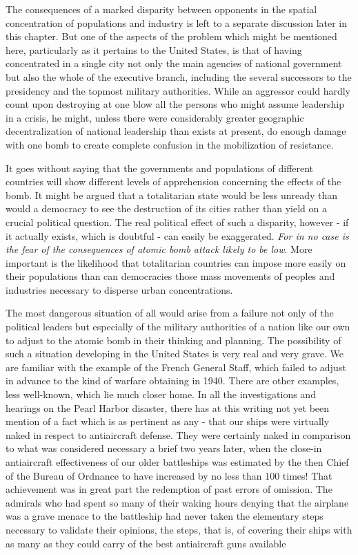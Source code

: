 \label{II-Retaliation1}

The consequences of a marked disparity between opponents in the spatial concentration of populations and industry is left to a separate discussion later in this chapter. But one of the aspects of the problem which might be mentioned here, particularly as it pertains to the United States, is that of having concentrated in a single city not only the main agencies of national government but also the whole of the executive branch, including the several successors to the presidency and the topmost military authorities. While an aggressor could hardly count upon destroying at one blow all the persons who might assume leadership in a crisis, he might, unless there were considerably greater geographic decentralization of national leadership than exists at present, do enough damage with one bomb to create complete confusion in the mobilization of resistance.

It goes without saying that the governments and populations of different countries will show different levels of apprehension concerning the effects of the bomb. It might be argued that a totalitarian state would be less unready than would a democracy to see the destruction of its cities rather than yield on a crucial political question. The real political effect of such a disparity, however - if it actually exists, which is doubtful - can easily be exaggerated. \emph{For in no case is the fear of the consequences of atomic bomb attack likely to be low}. More important is the likelihood that totalitarian countries can impose more easily on their populations than can democracies those mass movements of peoples and industries necessary to disperse urban concentrations.

The most dangerous situation of all would arise from a failure not only of the political leaders but especially of the military authorities of a nation like our own to adjust to the atomic bomb in their thinking and planning. The possibility of such a situation developing in the United States is very real and very grave. We are familiar with the example of the French General Staff, which failed to adjust in advance to the kind of warfare obtaining in 1940. There are other examples, less well-known, which lie much closer home. In all the investigations and hearings on the Pearl Harbor disaster, there has at this writing not yet been mention of a fact which is as pertinent as any - that our ships were virtually naked in respect to antiaircraft defense. They were certainly naked in comparison to what was considered necessary a brief two years later, when the close-in antiaircraft effectiveness of our older battleships was estimated by the then Chief of the Bureau of Ordnance to have increased by no less than 100 times! That achievement was in great part the redemption of past errors of omission. The admirals who had spent so many of their waking hours denying that the airplane was a grave menace to the battleship had never taken the elementary steps necessary to validate their opinions, the steps, that is, of covering their ships with as many as they could carry of the best antiaircraft guns available

